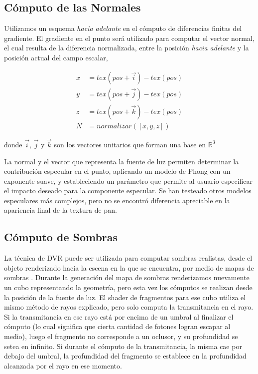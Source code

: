 \subsection{Cómputo de las Normales}
Utilizamos un esquema {\em hacia adelante} en el cómputo de diferencias finitas del gradiente.
El gradiente en el punto será utilizado para computar el vector normal, el cual resulta de la diferencia normalizada, entre la posición {\em hacia adelante} y la posición actual del campo escalar,


\begin{equation}
\begin{aligned}
x &= tex(pos+\vec{i}) - tex(pos)\\
y &= tex(pos+\vec{j}) - tex(pos)\\
z &= tex(pos+\vec{k}) - tex(pos) \\
N &= normalizar([x,y,z])
\end{aligned}
\end{equation}

\noindent donde $\vec{i}$, $\vec{j}$ y $\vec{k}$ son los vectores unitarios que forman una base en $\mathbb{R}^{3}$

La normal y el vector que representa la fuente de luz permiten determinar la contribución especular en el punto, aplicando un modelo de Phong con un exponente suave, y estableciendo un parámetro que permite al usuario especificar el impacto deseado para la componente especular.
Se han testeado otros modelos especulares más complejos, pero no se encontró diferencia apreciable en la apariencia final de la textura de pan.

\subsection{Cómputo de Sombras}
La técnica de DVR puede ser utilizada para computar sombras realistas, desde el objeto renderizado hacia la escena en la que se encuentra, por medio de mapas de sombras \cite{Williams1978}.
Durante la generación del mapa de sombras renderizamos nuevamente un cubo representando la geometría, pero esta vez los cómputos se realizan desde la posición de la fuente de luz.
El shader de fragmentos para ese cubo utiliza el mismo método de rayos explicado, pero solo computa la transmitancia en el rayo.
Si la transmitancia en ese rayo está por encima de un umbral al finalizar el cómputo (lo cual significa que cierta cantidad de fotones logran escapar al medio), luego el fragmento no corresponde a un oclusor, y su profundidad se setea en infinito.
Si durante el cómputo de la transmitancia, la misma cae por debajo del umbral, la profundidad del fragmento se establece en la profundidad alcanzada por el rayo en ese momento.

